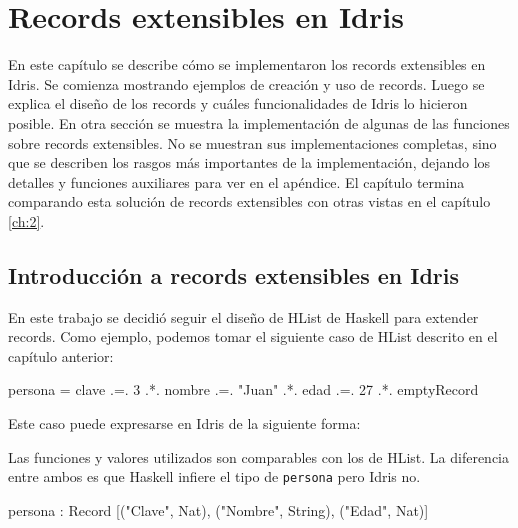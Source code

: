 
\chapter{Records extensibles en Idris}
\label{ch:3}

En este capítulo se describe cómo se implementaron los records extensibles en Idris. Se comienza mostrando ejemplos de creación y uso de records. Luego se explica el diseño de los records y cuáles funcionalidades de Idris lo hicieron posible. En otra sección se muestra la implementación de algunas de las funciones sobre records extensibles. No se muestran sus implementaciones completas, sino que se describen los rasgos más importantes de la implementación, dejando los detalles y funciones auxiliares para ver en el apéndice. El capítulo termina comparando esta solución de records extensibles con otras vistas en el capítulo \ref{ch:2}.

\section{Introducción a records extensibles en Idris}

En este trabajo se decidió seguir el diseño de HList de Haskell para extender records. Como ejemplo, podemos tomar el siguiente caso de HList descrito en el capítulo anterior:

\begin{code}
persona = clave .=. 3
  .*. nombre .=. "Juan"
  .*. edad .=. 27
  .*. emptyRecord
\end{code}

Este caso puede expresarse en Idris de la siguiente forma:


Las funciones y valores utilizados son comparables con los de HList. La diferencia entre ambos es que Haskell infiere el tipo de \texttt{persona} pero Idris no.

\begin{code}
persona : Record [("Clave", Nat), ("Nombre", String),
  ("Edad", Nat)]
\end{code}

